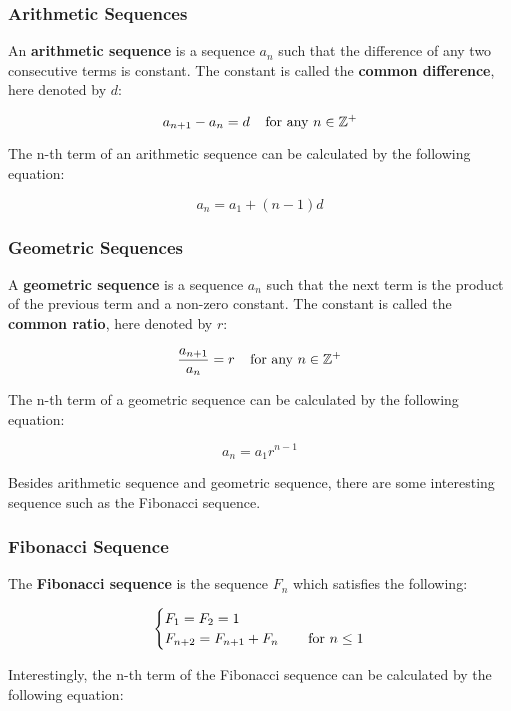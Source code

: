 \documentclass[a4paper,12pt]{article}
\begin{document}
\subsubsection{Arithmetic Sequences}
\begin{dft}
  An \textbf{arithmetic sequence} is a sequence $a_{n}$ such that the difference of any two consecutive terms is constant. The constant is called the \textbf{common difference}, here denoted by $d$:

  $$a_{n+1}-a_{n}=d\;\;\;\;\text{for any }n\in\mathbb{Z}^{+}$$
\end{dft}\n

The n-th term of an arithmetic sequence can be calculated by the following equation:

$$a_{n}=a_{1}+(n-1)d$$

\subsubsection{Geometric Sequences}
\begin{dft}
  A \textbf{geometric sequence} is a sequence $a_{n}$ such that the next term is the product of the previous term and a non-zero constant. The constant is called the \textbf{common ratio}, here denoted by $r$:

  $$\frac{a_{n+1}}{a_{n}}=r\;\;\;\;\text{for any }n\in\mathbb{Z}^{+}$$
\end{dft}\n

The n-th term of a geometric sequence can be calculated by the following equation:

$$a_{n}=a_{1}r^{n-1}$$\s

Besides arithmetic sequence and geometric sequence, there are some interesting sequence such as the Fibonacci sequence.

\subsubsection{Fibonacci Sequence}
\begin{dft}
  The \textbf{Fibonacci sequence} is the sequence $F_{n}$ which satisfies the following:

  $$\begin{cases}
    F_{1}=F_{2}=1&\\
    F_{n+2}=F_{n+1}+F_{n}&\;\;\;\;\text{for }n\leq 1
  \end{cases}$$
\end{dft}\n

Interestingly, the n-th term of the Fibonacci sequence can be calculated by the following equation:
\end{document}
